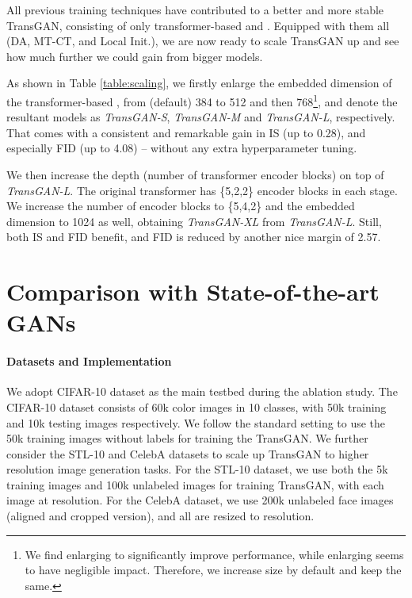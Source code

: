\documentclass{article}
\begin{document}
All previous training techniques have contributed to a better and more stable TransGAN, consisting of only transformer-based  and . Equipped with them all (DA, MT-CT, and Local Init.), we are now ready to scale TransGAN up and see how much further we could gain from bigger models. 



As shown in Table \ref{table:scaling}, we firstly enlarge the embedded dimension of the transformer-based , from (default) 384 to 512 and then 768\footnote{We find enlarging  to significantly improve performance, while enlarging  seems to have negligible impact. Therefore, we increase  size by default and keep  the same.}, and denote the resultant models as \textit{TransGAN-S}, \textit{TransGAN-M} and \textit{TransGAN-L}, respectively. That comes with a consistent and remarkable gain in IS (up to 0.28), and especially FID (up to 4.08) --  without any extra hyperparameter tuning.

We then increase the depth (number of transformer encoder blocks) on top of \textit{TransGAN-L}. The original transformer  has \{5,2,2\} encoder blocks in each stage. We increase the number of encoder blocks to \{5,4,2\} and the embedded dimension to 1024 as well, obtaining \textit{TransGAN-XL} from \textit{TransGAN-L}. Still, both IS and FID benefit, and FID is reduced by another nice margin of 2.57.

















\section{Comparison with State-of-the-art GANs}
\paragraph{Datasets and Implementation} We adopt CIFAR-10 \cite{krizhevsky2009learning} dataset as the main testbed during the ablation study. The CIFAR-10 dataset consists of 60k  color images in 10 classes, with 50k training and 10k testing images respectively. We follow the standard setting to use the 50k training images without labels for training the TransGAN. We further consider the STL-10 \cite{coates2011analysis} and CelebA \cite{liu2015faceattributes} datasets to scale up TransGAN to higher resolution image generation tasks. For the STL-10 dataset, we use both the 5k training images and 100k unlabeled images for training TransGAN, with each image at  resolution.  For the CelebA dataset, we use 200k unlabeled face images (aligned and cropped version), and all are resized to  resolution.
\end{document}
